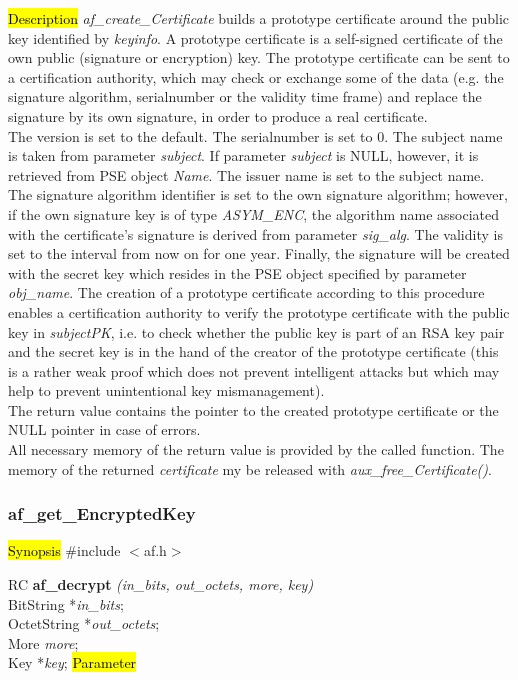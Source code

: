 \hl{Description}
{\em af\_create\_Certificate} builds a prototype certificate around the
public key identified by {\em keyinfo}. A prototype certificate is a self-signed
certificate of the own public (signature or encryption) key. The 
prototype certificate can be sent to a certification authority, which may check
or exchange some of the data (e.g. the signature algorithm, serialnumber or the validity time frame)
and replace the signature by its own signature, in order to produce a real certificate.
\\ [1em]
The version is set to the default. The serialnumber is set to $0$.
The subject name is taken from parameter {\em subject}. If parameter {\em subject} is NULL, however, it is 
retrieved from PSE object {\em Name}. The issuer name is set to the subject name.
The signature algorithm identifier is set to the
own signature algorithm; however, if the own signature 
key is of type {\em ASYM\_ENC}, the algorithm name associated with the certificate's signature is derived
from parameter {\em sig\_alg}. The validity is set to the interval
from now on for one year. Finally, the signature will be created
with the secret key which resides in the PSE object specified by parameter {\em obj\_name}.
The creation of a prototype certificate according to this procedure enables a
certification authority to verify the prototype certificate with
the public key in {\em subjectPK}, i.e. to check whether the public
key is part of an RSA key pair and the secret key is in the hand of the
creator of the prototype certificate (this is a rather weak proof
which does not prevent intelligent attacks but which may help to prevent
unintentional key mismanagement).
\\ [1em]
The return value contains the pointer to the created prototype certificate or
the NULL pointer in case of errors.
\\ [1em]
All necessary memory of the return value is provided by the called function.
The memory of the returned {\em certificate} my be released with 
{\em aux\_free\_Certificate()}.


\subsubsection{af\_get\_EncryptedKey}
\label{af_decrypt}
\hl{Synopsis}
\#include $<$af.h$>$

RC {\bf af\_decrypt} {\em (in\_bits, out\_octets, more, key)} \\
BitString *{\em in\_bits}; \\
OctetString *{\em out\_octets}; \\
More {\em more}; \\
Key *{\em key};
\hl{Parameter}

